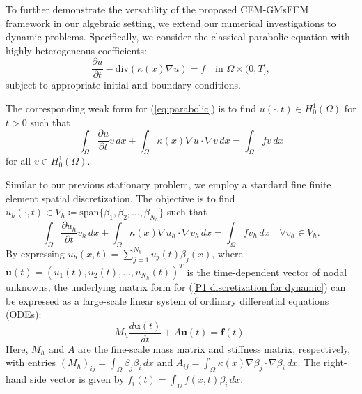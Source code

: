 
To further demonstrate the versatility of the proposed CEM-GMsFEM framework in our algebraic setting, we extend our numerical investigations to dynamic problems. Specifically, we consider the classical parabolic equation with highly heterogeneous coefficients:
\begin{equation}
\label{eq:parabolic}
\frac{\partial u}{\partial t} - \text{div}(\kappa(x)\nabla u) = f \quad \text{in } \Omega \times (0, T],
\end{equation}
subject to appropriate initial and boundary conditions. 

The corresponding weak form for (\ref{eq:parabolic}) is to find $u(\cdot, t) \in H^1_0(\Omega)$ for $t > 0$ such that
\begin{equation}
\label{weak form dynamic}
\int_{\Omega}\frac{\partial u}{\partial t}v \,dx + \int_{\Omega}\kappa(x)\nabla u\cdot\nabla v \,dx = \int_{\Omega}f v \,dx
\end{equation}
for all $v\in H^1_0(\Omega)$. 

Similar to our previous stationary problem, we employ a standard fine finite element spatial discretization. The objective is to find $u_h(\cdot, t)\in V_h\coloneqq\text{span}\{\beta_1,\beta_2,...,\beta_{N_h}\}$ such that
\begin{equation}
\label{P1 discretization for dynamic}
\int_{\Omega}\frac{\partial u_h}{\partial t}v_h \,dx + \int_{\Omega}\kappa(x)\nabla u_h\cdot\nabla v_h \,dx = \int_{\Omega} f v_h \,dx \quad\forall v_h\in V_h.
\end{equation}
By expressing $u_h(x,t) = \sum_{j=1}^{N_h} u_j(t)\beta_j(x)$, where $\mathbf{u}(t) = (u_1(t),u_2(t),...,u_{N_h}(t))^T$ is the time-dependent vector of nodal unknowns, the underlying matrix form for (\ref{P1 discretization for dynamic}) can be expressed as a large-scale linear system of ordinary differential equations (ODEs):
\begin{equation}
\label{eq:semi-discrete_parabolic}
M_h \frac{d\mathbf{u}(t)}{dt} + A \mathbf{u}(t) = \mathbf{f}(t).
\end{equation}
Here, $M_h$ and $A$ are the fine-scale mass matrix and stiffness matrix, respectively, with entries $(M_h)_{ij}=\int_{\Omega}\beta_j\beta_i\,dx$ and $A_{ij}=\int_{\Omega}\kappa(x)\nabla\beta_j\cdot\nabla\beta_i\,dx$. The right-hand side vector is given by $f_i(t)=\int_{\Omega}f(x,t)\beta_i\,dx$. 

